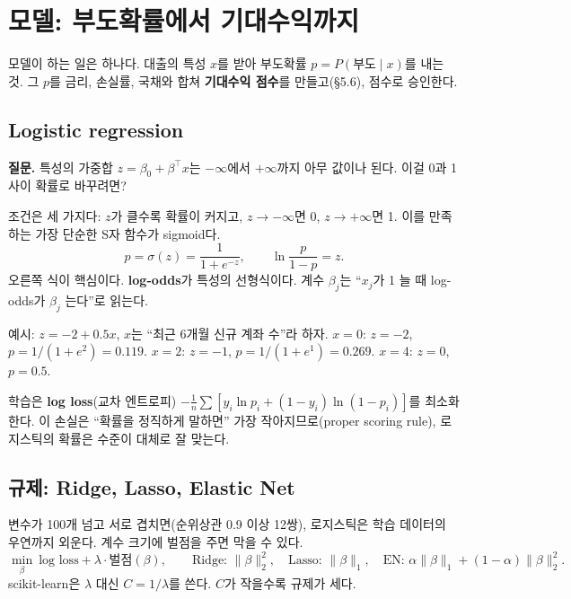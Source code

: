 \chapter{모델: 부도확률에서 기대수익까지}

모델이 하는 일은 하나다. 대출의 특성 $x$를 받아 부도확률 $p=P(\text{부도}\mid x)$를 내는 것. 그 $p$를 금리, 손실률, 국채와 합쳐 \textbf{기대수익 점수}를 만들고(\S5.6), 점수로 승인한다.

\section{Logistic regression}
\textbf{질문.} 특성의 가중합 $z=\beta_0+\beta^\top x$는 $-\infty$에서 $+\infty$까지 아무 값이나 된다. 이걸 0과 1 사이 확률로 바꾸려면?

조건은 세 가지다: $z$가 클수록 확률이 커지고, $z\to-\infty$면 0, $z\to+\infty$면 1. 이를 만족하는 가장 단순한 S자 함수가 sigmoid다.
\[
p=\sigma(z)=\frac{1}{1+e^{-z}},\qquad \ln\frac{p}{1-p}=z .
\]
오른쪽 식이 핵심이다. \textbf{log-odds}가 특성의 선형식이다. 계수 $\beta_j$는 ``$x_j$가 1 늘 때 log-odds가 $\beta_j$ 는다''로 읽는다.

\begin{workout}[sigmoid에 숫자 넣기]
 예시: $z=-2+0.5x$, $x$는 ``최근 6개월 신규 계좌 수''라 하자.
 $x=0$: $z=-2$, $p=1/(1+e^{2})=0.119$. 
 $x=2$: $z=-1$, $p=1/(1+e^{1})=0.269$.
 $x=4$: $z=0$, $p=0.5$.
\end{workout}

학습은 \textbf{log loss}(교차 엔트로피) $-\frac1n\sum[y_i\ln p_i+(1-y_i)\ln(1-p_i)]$를 최소화한다. 이 손실은 ``확률을 정직하게 말하면'' 가장 작아지므로(proper scoring rule), 로지스틱의 확률은 수준이 대체로 잘 맞는다.

\section{규제: Ridge, Lasso, Elastic Net}
변수가 100개 넘고 서로 겹치면(순위상관 0.9 이상 12쌍), 로지스틱은 학습 데이터의 우연까지 외운다. 계수 크기에 벌점을 주면 막을 수 있다.
\[
\min_\beta\ \text{log loss}+\lambda\cdot\text{벌점}(\beta),\qquad
\text{Ridge: }\|\beta\|_2^2,\quad \text{Lasso: }\|\beta\|_1,\quad \text{EN: }\alpha\|\beta\|_1+(1-\alpha)\|\beta\|_2^2 .
\]
scikit-learn은 $\lambda$ 대신 $C=1/\lambda$를 쓴다. $C$가 작을수록 규제가 세다.

